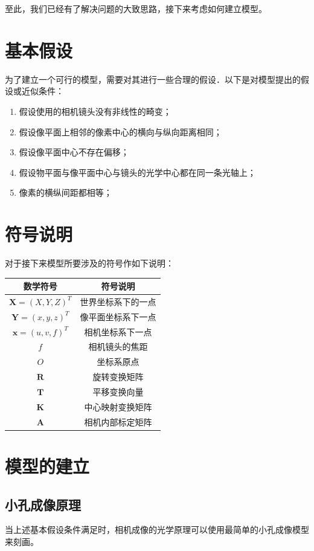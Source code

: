 \documentclass{article}
\numberwithin{equation}{section}						%
\numberwithin{figure}{section}							%
\begin{document}
\begin{sloppypar}
	至此，我们已经有了解决问题的大致思路，接下来考虑如何建立模型。
	\section{基本假设}
	为了建立一个可行的模型，需要对其进行一些合理的假设．以下是对模型提出的假设或近似条件：
	\begin{enumerate}
		\item 假设使用的相机镜头没有非线性的畸变；
		\item 假设像平面上相邻的像素中心的横向与纵向距离相同；
		\item 假设像平面中心不存在偏移；
		\item 假设物平面与像平面中心与镜头的光学中心都在同一条光轴上；
		\item 像素的横纵间距都相等；
	\end{enumerate}
	\section{符号说明}
	对于接下来模型所要涉及的符号作如下说明：
	\begin{table}[H]
		\centering
		\begin{tabular}{c|c}
			\hline\hline
			数学符号 & 符号说明 \\ \hline
			${\bm X} = (X, Y, Z)^T$ & 世界坐标系下的一点 \\ 
			${\bm Y} = (x, y, z)^T$ & 像平面坐标系下一点 \\ 
			${\bm x} = (u, v, f)^T$ & 相机坐标系下一点 \\ 
			$f$ & 相机镜头的焦距 \\
			$O$ & 坐标系原点 \\
			${\bm R}$ & 旋转变换矩阵 \\ 
			${\bm T}$ & 平移变换向量 \\
			${\bm K}$ & 中心映射变换矩阵 \\
			${\bm A}$ & 相机内部标定矩阵 \\
			\hline
		\end{tabular}
	\end{table}
	\section{模型的建立}
	\subsection{小孔成像原理}
	当上述基本假设条件满足时，相机成像的光学原理可以使用最简单的小孔成像模型来刻画。
	

\end{sloppypar}
\end{document}
